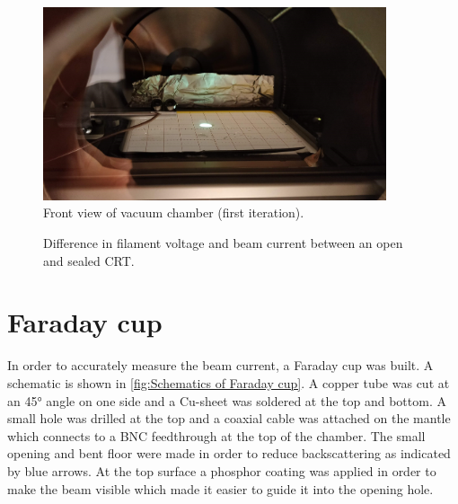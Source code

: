 \begin{figure}[h]
	\centering
	\includegraphics[width=0.9\textwidth]{./Chapters/beam-characterization/center_image}
	\caption{Front view of vacuum chamber (first iteration).}
	\label{fig:Front view of vacuum chamber (first iteration)}
\end{figure}


\begin{figure}[ht]
	\centering
	
	\begin{tikzpicture}
		
	\end{tikzpicture}
	
	\caption{Difference in filament voltage and beam current between an open and sealed CRT.}
	\label{fig:Difference in filament voltage and beam current between an open and sealed CRT}
\end{figure}

\section{Faraday cup}
\label{sec:Faraday cup}


In order to accurately measure the beam current, a Faraday cup was built. A schematic is shown in \cref{fig:Schematics of Faraday cup}. A copper tube was cut at an \ang{45} angle on one side and a Cu-sheet was soldered at the top and bottom. A small hole  was drilled at the top and a coaxial cable was attached on the mantle which connects to a BNC feedthrough at the top of the chamber. The small opening and bent floor were made in order to reduce backscattering as indicated by blue arrows. At the top surface a phosphor coating was applied in order to make the beam visible which made it easier to guide it into the opening hole.



